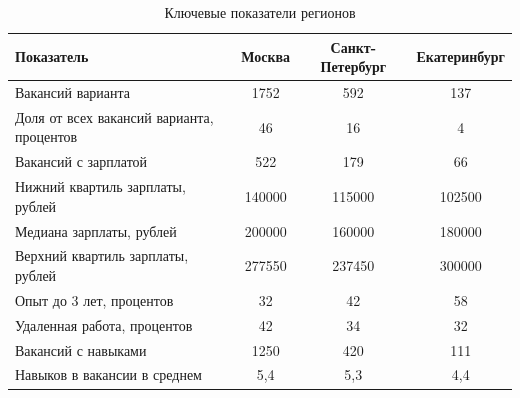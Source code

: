 \begin{table}[H]
\centering
\small
\begin{tabular}{|L{7.5cm}|c|c|c|}
\hline
Показатель & Москва & Санкт-Петербург & Екатеринбург \\
\hline
Вакансий варианта & 1752 & 592 & 137 \\
Доля от всех вакансий варианта, процентов & 46 & 16 & 4 \\
Вакансий с зарплатой & 522 & 179 & 66 \\
Нижний квартиль зарплаты, рублей & 140000 & 115000 & 102500 \\
Медиана зарплаты, рублей & 200000 & 160000 & 180000 \\
Верхний квартиль зарплаты, рублей & 277550 & 237450 & 300000 \\
Опыт до 3 лет, процентов & 32 & 42 & 58 \\
Удаленная работа, процентов & 42 & 34 & 32 \\
Вакансий с навыками & 1250 & 420 & 111 \\
Навыков в вакансии в среднем & 5,4 & 5,3 & 4,4 \\
\hline
\end{tabular}
\caption{Ключевые показатели регионов}\label{tab:reg1}
\end{table}

